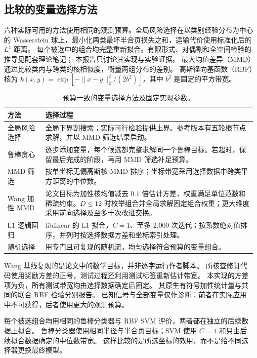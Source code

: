 \documentclass[11pt,a4paper]{article}
\begin{document}
\subsection{比较的变量选择方法}
六种实际可用的方法使用相同的观测预算。全局风险选择在以类别经验分布为中心的
Wasserstein 球上，最小化两类最坏半合页损失之和，运输代价使用标准化后的 $L^1$ 距离。
每个被选中的组合均完整重新拟合。有限形式、对偶割和全空间检验的推导见配套理论笔记；
本报告只讨论其实现与实验证据。
最大均值差异（MMD）通过比较类内与跨类的核相似度，衡量两组分布的差别。
高斯径向基函数（RBF）核为
$k(x,y)=\exp[-\|x-y\|_2^2/(2b^2)]$，其中 $b^2$ 是固定的平方带宽。
\begin{table}[htbp]\centering\small
\caption{预算一致的变量选择方法及固定实现参数。}\label{tab:selectors}
\begin{tabularx}{\linewidth}{@{}p{26mm}Y@{}}\toprule
方法 & 选择过程\\\midrule
全局风险选择 & 全局下界割搜索；实际可行检验提供上界。参考版本有五轮根节点求解，并以 MMD 筛选结果启动。\\
鲁棒贪心 & 逐步添加变量，每个候选都完整求解同一个鲁棒目标。若超时，保留最后完成的阶段，再用 MMD 筛选补足预算。\\
MMD 筛选 & 按单坐标无偏高斯核 MMD 排序；坐标带宽采用选择数据中跨类平方距离的中位数。\\
Wang 加性 MMD & 论文目标为加性核均值减去 $0.1$ 倍估计方差，权重满足单位范数和稀疏约束。$D\le12$ 时枚举组合并全局求解固定组合权重；更大维度采用前向选择及至多十次改进交换。\\
L1 逻辑回归 & liblinear 的 L1 拟合，$C=1$、至多 2,000 次迭代；按系数绝对值排序，并列时按选择数据方差和坐标索引处理。\\
随机选择 & 用专门且可复现的随机流，均匀选择符合预算的变量组合。\\\bottomrule
\end{tabularx}\end{table}

Wang 基线复现的是论文中的数学目标，并非逐字运行作者脚本。
所核查修订代码使用奖励方差的正号，测试过程还利用测试标签重新估计带宽。
本实现的方差项为负，所有测试带宽均由选择数据确定后固定。
其原生有符号加性统计量与共同的联合 RBF 检验分别报告。
已知信号与全部变量仅作诊断：前者在实际应用中不可获得，后者使用更大的观测预算。

每个被选组合均用相同的鲁棒分类器与 RBF SVM 评价，两者都在独立的后续数据上拟合。
鲁棒分类器使用相同半径与半合页目标；SVM 使用 $C=1$ 和只由后续拟合数据确定的中位数带宽。
这样比较的是所选坐标的效用，而不是给不同选择器更换最终模型。
\end{document}
